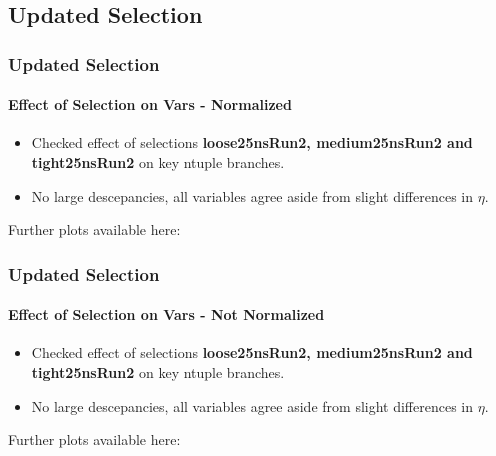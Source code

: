 \documentclass[8pt,serif]{beamer}
\begin{document}
\subsection{Updated Selection}
\begin{frame}
\frametitle{Updated Selection}
\framesubtitle{Effect of Selection on Vars - Normalized}

\vspace{10mm}

\begin{itemize}
\item Checked effect of selections \textbf{loose25nsRun2, medium25nsRun2 and tight25nsRun2} on key ntuple branches.
\item No large descepancies, all variables agree aside from slight differences in $\eta$. 
\end{itemize}
  

Further plots available here:	\href{https://lcorpe.web.cern.ch/lcorpe/MoCa/data-data/moca-talk-131115/data-data-data-selection-plots/}{}
\end{frame}
\begin{frame}
\frametitle{Updated Selection}
\framesubtitle{Effect of Selection on Vars - Not Normalized}

\vspace{10mm}

\begin{itemize}
\item Checked effect of selections \textbf{loose25nsRun2, medium25nsRun2 and tight25nsRun2} on key ntuple branches.
\item No large descepancies, all variables agree aside from slight differences in $\eta$. 
\end{itemize}
  
Further plots available here:	\href{https://lcorpe.web.cern.ch/lcorpe/MoCa/data-data/moca-talk-131115/data-data-data-selection-plots/}{}
\end{frame}
\end{document}
